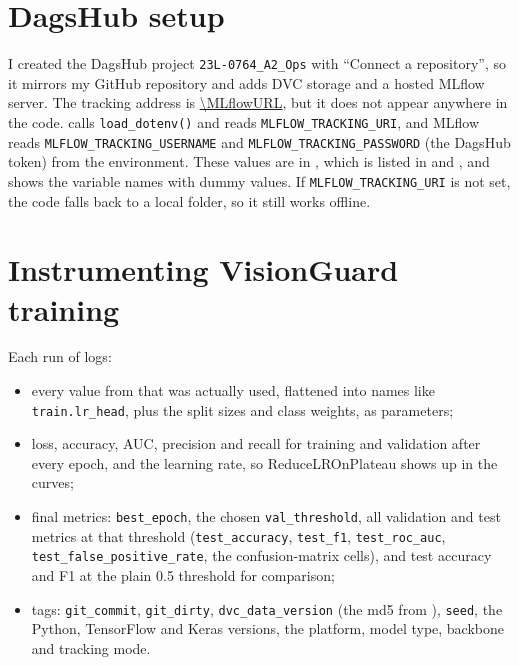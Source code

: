 \section{DagsHub setup}
I created the DagsHub project \texttt{23L-0764\_A2\_Ops} with ``Connect a repository'', so it
mirrors my GitHub repository and adds DVC storage and a hosted MLflow server. The tracking address
is \url{\MLflowURL}, but it does not appear anywhere in the code.  calls
\texttt{load\_dotenv()} and reads \texttt{MLFLOW\_TRACKING\_URI}, and MLflow reads
\texttt{MLFLOW\_TRACKING\_USERNAME} and \texttt{MLFLOW\_TRACKING\_PASSWORD} (the DagsHub token) from
the environment. These values are in , which is listed in  and
, and  shows the variable names with dummy values. If
\texttt{MLFLOW\_TRACKING\_URI} is not set, the code falls back to a local  folder, so
it still works offline.


\section{Instrumenting VisionGuard training}
Each run of  logs:
\begin{itemize}
\item every value from  that was actually used, flattened into names like
\texttt{train.lr\_head}, plus the split sizes and class weights, as parameters;
\item loss, accuracy, AUC, precision and recall for training and validation after every epoch, and
the learning rate, so ReduceLROnPlateau shows up in the curves;
\item final metrics: \texttt{best\_epoch}, the chosen \texttt{val\_threshold}, all validation and
test metrics at that threshold (\texttt{test\_accuracy}, \texttt{test\_f1},
\texttt{test\_roc\_auc}, \texttt{test\_false\_positive\_rate}, the confusion-matrix cells), and
test accuracy and F1 at the plain 0.5 threshold for comparison;
\item tags: \texttt{git\_commit}, \texttt{git\_dirty}, \texttt{dvc\_data\_version} (the md5 from
), \texttt{seed}, the Python, TensorFlow and Keras versions, the platform, model
type, backbone and tracking mode.
\end{itemize}

